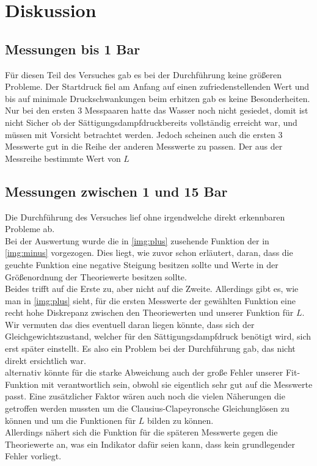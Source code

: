 \section{Diskussion}
\subsection{Messungen bis 1 Bar}

Für diesen Teil des Versuches gab es bei der Durchführung keine größeren Probleme. Der Startdruck fiel am Anfang auf einen 
zufriedenstellenden Wert und bis auf minimale Druckschwankungen beim erhitzen gab es keine Besonderheiten. Nur bei den ersten
3 Messpaaren hatte das Wasser noch nicht gesiedet, domit ist nicht Sicher ob der Sättigungsdampfdruckbereits vollständig erreicht war,
und müssen mit Vorsicht betrachtet werden. Jedoch scheinen auch die ersten 3 Messwerte gut in die Reihe der anderen Messwerte zu passen.
Der aus der Messreihe bestimmte Wert von $L$ 




\subsection{Messungen zwischen 1 und 15 Bar}

Die Durchführung des Versuches lief ohne irgendwelche direkt erkennbaren Probleme ab.\\
Bei der Auswertung wurde die in \ref{img:plus} zusehende Funktion der in \ref{img:minus} vorgezogen.
Dies liegt, wie zuvor schon erläutert, daran, dass die geuchte Funktion eine negative Steigung besitzen sollte und Werte in der Größenordnung der Theoriewerte besitzen sollte.\\
Beides trifft auf die Erste zu, aber nicht auf die Zweite.
Allerdings gibt es, wie man in \ref{img:plus} sieht, für die ersten Messwerte der gewählten Funktion eine recht hohe Diskrepanz zwischen den Theoriewerten und unserer Funktion für $L$.
Wir vermuten das dies eventuell daran liegen könnte, dass sich der Gleichgewichtszustand, welcher für den Sättigungsdampfdruck benötigt wird, sich erst später einstellt.
Es also ein Problem bei der Durchführung gab, das nicht direkt ersichtlich war.\\
alternativ könnte für die starke Abweichung auch der große Fehler unserer Fit-Funktion mit verantwortlich sein, obwohl sie eigentlich sehr gut auf 
die Messwerte passt. Eine zusätzlicher Faktor wären auch noch die vielen Näherungen die getroffen werden mussten um die Clausius-Clapeyronsche Gleichunglösen zu können
und um die Funktionen für $L$ bilden zu können.\\
Allerdings nähert sich die Funktion für die späteren Messwerte gegen die Theoriewerte an, was ein Indikator dafür seien kann, dass kein grundlegender Fehler vorliegt.\\

